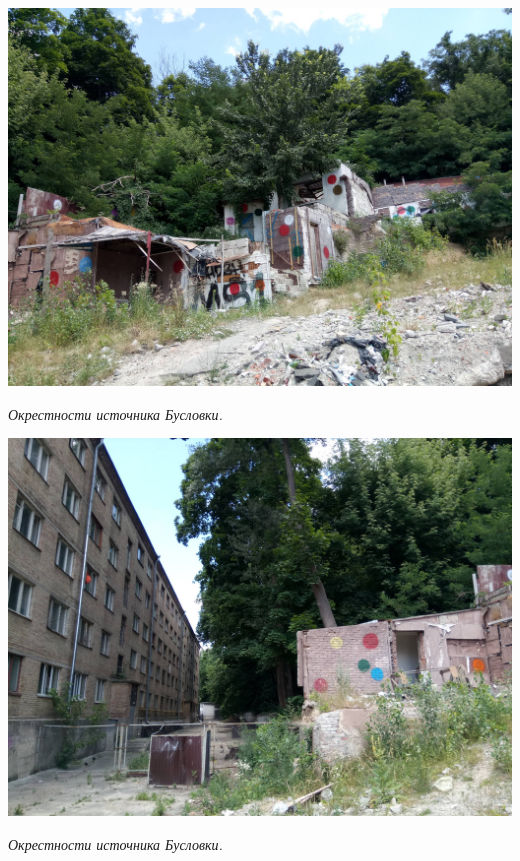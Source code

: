 \begin{center}
\includegraphics[width=\linewidth]{rpix/IMG_20190619_125950.jpg}

\textit{Окрестности источника Бусловки.}
\end{center}


\begin{center}
\includegraphics[width=\linewidth]{rpix/IMG_20190619_125951.jpg}

\textit{Окрестности источника Бусловки.}
\end{center}


\newpage


